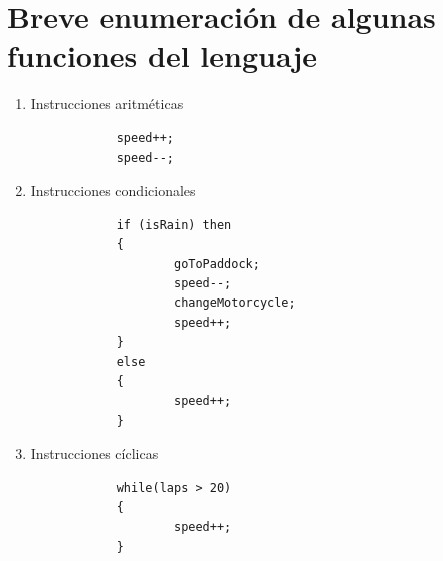 \documentclass[12pt, letterpaper,spanish]{article}
\theoremstyle{definition}
\theoremstyle{remark}
\begin{document}
\section{Breve enumeración de algunas funciones del lenguaje}
	\begin{enumerate}
		\item Instrucciones aritméticas
		\begin{verbatim}
			speed++;
			speed--;
		\end{verbatim}
		\item Instrucciones condicionales
		\begin{verbatim}
			if (isRain) then 
			{
					goToPaddock;
					speed--;
					changeMotorcycle;
					speed++;
			}
			else
			{
					speed++;
			}
		\end{verbatim}
		\item Instrucciones cíclicas
		\begin{verbatim}
			while(laps > 20)
			{
					speed++;
			}
		\end{verbatim}
	\end{enumerate}
\end{document}
